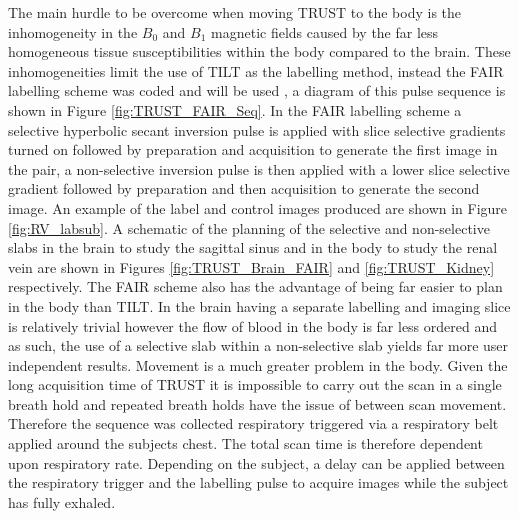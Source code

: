 The main hurdle to be overcome when moving \ac{TRUST} to the body is the inhomogeneity in the $B_0$ and $B_1$ magnetic fields caused by the far less homogeneous tissue susceptibilities within the body compared to the brain. These inhomogeneities limit the use of \ac{TILT} as the labelling method, instead the \ac{FAIR} labelling scheme was coded and will be used \cite{martirosian_fair_2004}, a diagram of this pulse sequence is shown in Figure \ref{fig:TRUST_FAIR_Seq}. In the \ac{FAIR} labelling scheme a selective hyperbolic secant inversion pulse is applied with slice selective gradients turned on followed by \ttwo preparation and acquisition to generate the first image in the pair, a non-selective inversion pulse is then applied with a lower slice selective gradient followed by \ttwo preparation and then acquisition to generate the second image. An example of the label and control images produced are shown in Figure \ref{fig:RV_labsub}. A schematic of the planning of the selective and non-selective slabs in the brain to study the sagittal sinus and in the body to study the renal vein are shown in Figures \ref{fig:TRUST_Brain_FAIR} and \ref{fig:TRUST_Kidney} respectively. The \ac{FAIR} scheme also has the advantage of being far easier to plan in the body than \ac{TILT}. In the brain having a separate labelling and imaging slice is relatively trivial however the flow of blood in the body is far less ordered and as such, the use of a selective slab within a non-selective slab yields far more user independent results. Movement is a much greater problem in the body. Given the long acquisition time of \ac{TRUST} it is impossible to carry out the scan in a single breath hold and repeated breath holds have the issue of between scan movement. Therefore the sequence was collected respiratory triggered via a respiratory belt applied around the subjects chest. The total scan time is therefore dependent upon respiratory rate. Depending on the subject, a delay can be applied between the respiratory trigger and the labelling pulse to acquire images while the subject has fully exhaled.

